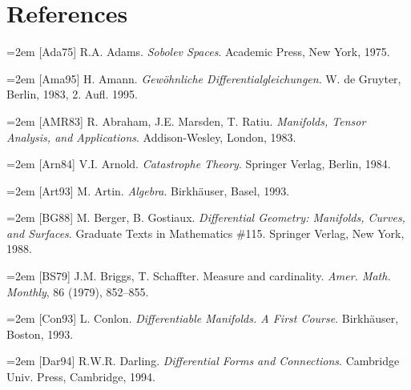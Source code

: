 \chapter*{\fontsize{23.6pt}{28.3pt}\selectfont References}

\begingroup
\setlength{\parindent}{0pt}
\raggedright

\par\hangindent=2em [Ada75] R.A. Adams. \emph{Sobolev Spaces}. Academic Press, New York, 1975.\par

\par\hangindent=2em [Ama95] H. Amann. \emph{Gewöhnliche Differentialgleichungen}. W. de Gruyter, Berlin, 1983, 2. Aufl. 1995.\par

\par\hangindent=2em [AMR83] R. Abraham, J.E. Marsden, T. Ratiu. \emph{Manifolds, Tensor Analysis, and Applications}. Addison-Wesley, London, 1983.\par

\par\hangindent=2em [Arn84] V.I. Arnold. \emph{Catastrophe Theory}. Springer Verlag, Berlin, 1984.\par

\par\hangindent=2em [Art93] M. Artin. \emph{Algebra}. Birkhäuser, Basel, 1993.\par

\par\hangindent=2em [BG88] M. Berger, B. Gostiaux. \emph{Differential Geometry: Manifolds, Curves, and Surfaces}. Graduate Texts in Mathematics \#115. Springer Verlag, New York, 1988.\par

\par\hangindent=2em [BS79] J.M. Briggs, T. Schaffter. Measure and cardinality. \emph{Amer. Math. Monthly}, 86 (1979), 852–855.\par

\par\hangindent=2em [Con93] L. Conlon. \emph{Differentiable Manifolds. A First Course}. Birkhäuser, Boston, 1993.\par

\par\hangindent=2em [Dar94] R.W.R. Darling. \emph{Differential Forms and Connections}. Cambridge Univ. Press, Cambridge, 1994.\par


